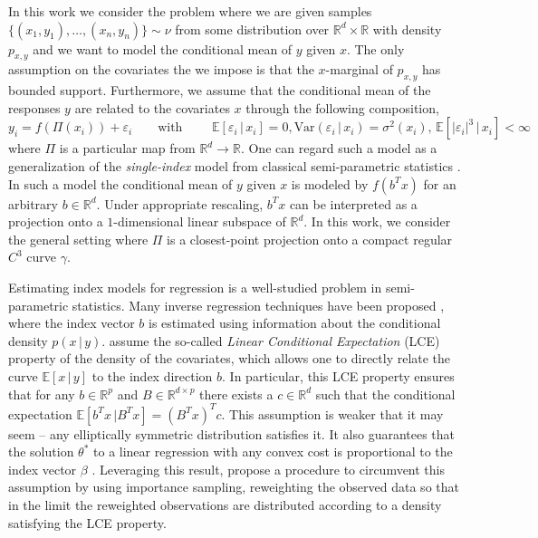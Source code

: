 \documentclass[11pt]{article}
\begin{document}
In this work we consider the problem where we are given samples $\{(x_1, y_1), \dots, (x_n, y_n)\} \sim \nu$ from some distribution over $\mathbb{R}^d\times \mathbb{R}$ with density $p_{x,y}$ and we want to model the conditional mean of $y$ given $x$. The only assumption on the covariates the we impose is that the $x$-marginal of $p_{x,y}$ has bounded support. Furthermore, we assume that the conditional mean of the responses $y$ are related to the covariates $x$ through the following composition,
\begin{equation}
    y_i = f(\Pi(x_i)) + \varepsilon_i \qquad \text{with } \qquad \mathbb{E}[\varepsilon_i \, | \, x_i] = 0, \text{Var}(\varepsilon_i \,| \, x_i) = \sigma^2(x_i),\, \mathbb{E}[|\varepsilon_i|^3 \, |\, x_i] < \infty \label{eq: the model}
\end{equation}
where $\Pi$ is a particular map from $\mathbb{R}^d \rightarrow \mathbb{R}$. One can regard such a model as a generalization of the \textit{single-index} model from classical semi-parametric statistics \cite{gyorfi2002distribution}. In such a model the conditional mean of $y$ given $x$ is modeled by $f(b^Tx)$ for an arbitrary $b\in \mathbb{R}^d$. Under appropriate rescaling, $b^Tx$ can be interpreted as a projection onto a $1$-dimensional linear subspace of $\mathbb{R}^d$. In this work, we consider the general setting where $\Pi$ is a closest-point projection onto a compact regular $C^3$ curve $\gamma$.

Estimating index models for regression is a well-studied problem in semi-parametric statistics. Many inverse regression techniques have been proposed \cite{li1991sliced, li2005contour, li2007directional, dennis2000save}, where the index vector $b$ is estimated using information about the conditional density $p(x \, |\, y)$. \citet{li1991sliced} assume the so-called \textit{Linear Conditional Expectation} (LCE) property of the density of the covariates, which allows one to directly relate the curve $\mathbb{E}[x\,|\,y]$ to the index direction $b$. In particular, this LCE property ensures that for any $b \in \mathbb{R}^p$ and $B \in \mathbb{R}^{d\times p}$ there exists a $c \in \mathbb{R}^d$ such that the conditional expectation $\mathbb{E}[b^{T}x \, | B^{T}x] = (B^{T}x)^T c$. This assumption is weaker that it may seem -- any elliptically symmetric distribution satisfies it. It also guarantees that the solution $\theta^*$ to a linear regression with any convex cost is proportional to the index vector $\beta$ \cite{li1989regression}. Leveraging this result, \citet{Newey_Ruud_2005} propose a procedure to circumvent this assumption by using importance sampling, reweighting the observed data so that in the limit the reweighted observations are distributed according to a density satisfying the LCE property. 
\end{document}
